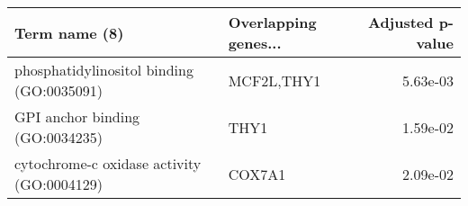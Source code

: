\begin{tabular}{llr}
\toprule
                             Term name (8) & Overlapping genes... &  Adjusted p-value \\
\midrule
 phosphatidylinositol binding (GO:0035091) &           MCF2L,THY1 &          5.63e-03 \\
           GPI anchor binding (GO:0034235) &                 THY1 &          1.59e-02 \\
cytochrome-c oxidase activity (GO:0004129) &               COX7A1 &          2.09e-02 \\
\bottomrule
\end{tabular}
